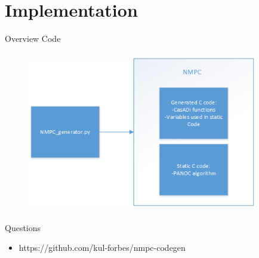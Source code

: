 \documentclass[11pt,t]{beamer}
\begin{document}
\section{Implementation}
\begin{frame}{Overview Code}
\begin{figure}
	\centering
	\includegraphics[width=10cm, height=7cm]{DrawingVisio.png}
\end{figure}
\end{frame}

\begin{frame}{Questions}
\begin{itemize}
	\item https://github.com/kul-forbes/nmpc-codegen
\end{itemize}
\end{frame}
\end{document}
